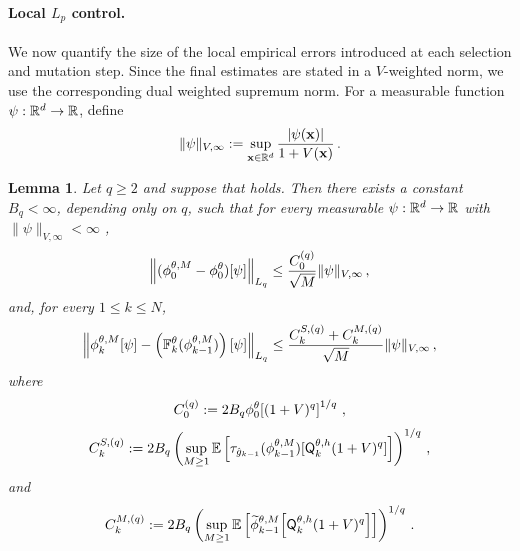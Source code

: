 \documentclass[11pt]{article}
\theoremstyle{plain}
\newtheorem{lemma}[theorem]{Lemma}
\theoremstyle{definition}
\theoremstyle{remark}
\begin{document}
\paragraph{Local $L_p$ control.}
We now quantify the size of the local empirical errors introduced at each selection and mutation step. Since the final estimates are stated in a $V$-weighted norm, we use the corresponding dual weighted supremum norm. For a measurable function $\psi:\mathbb{R}^d\to\mathbb{R}$, define
$$
\|\psi\|_{V,\infty} := \sup_{\mathbf{x}\in\mathbb{R}^d} \frac{|\psi(\mathbf{x})|}{1+V(\mathbf{x})} \,.
$$

\begin{lemma}
\label{lem:local_error_lp}
Let $q\ge2$ and suppose that  holds. Then
there exists a constant $B_q<\infty$, depending only on $q$, such that for
every measurable $\psi:\mathbb{R}^d\to\mathbb{R}$ with $\|\psi\|_{V,\infty}<\infty$ ,
\begin{equation} \label{eq:init_smc}
\normEc{ (\mcfilter{0}-\approxfilter{0})[\psi] }_{L_q} \le\frac{C_0^{(q)}}{\sqrt M} \|\psi\|_{V,\infty} \eqsp,
\end{equation}
and, for every $1\le k\le N$,
\begin{equation} \label{eq:local_lp_total_final}
\normEc{ \mcfilter{k}[\psi] - \left(\filtertransform{k}[\theta](\mcfilter{k-1})\right)[\psi] }_{L_q}
\le \frac{C_k^{S,(q)} + C_k^{M,(q)} }{\sqrt M} \|\psi\|_{V,\infty} \eqsp,
\end{equation}
where
$$
C_0^{(q)} \eqdef 2B_q \approxfilter{0}[(1+V)^q]^{1/q} \eqsp,
$$
$$
C_k^{S,(q)} \eqdef 2B_q\left( \sup_{M\ge1} \E\left[\tau_{\approxpot{k-1}}(\mcfilter{k-1})[\mk{k}[\theta,h](1+V)^q]\right]\right)^{1/q} \eqsp,
$$
and
$$
C_k^{M,(q)} \eqdef 2B_q \left( \sup_{M\ge1} \E\left[ \tildemcfilter{k-1} [ \mk{k}[\theta,h](1+V)^q ] \right] \right)^{1/q} \eqsp.
$$
\end{lemma}
\end{document}
